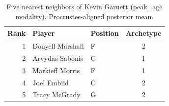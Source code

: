 \begin{table}[htbp]
  \centering\small
  \begin{tabular}{rllc}
    \toprule
    Rank & Player & Position & Archetype \\
    \midrule
    1 & Donyell Marshall & F & 2 \\
    2 & Arvydas Sabonis & C & 1 \\
    3 & Markieff Morris & F & 1 \\
    4 & Joel Embiid & C & 2 \\
    5 & Tracy McGrady & G & 2 \\
    \bottomrule
  \end{tabular}
  \caption{Five nearest neighbors of Kevin Garnett (peak_age modality), Procrustes-aligned posterior mean.}
  \label{tab:Kevin_Garnett_neighbors_peak_age}
\end{table}

